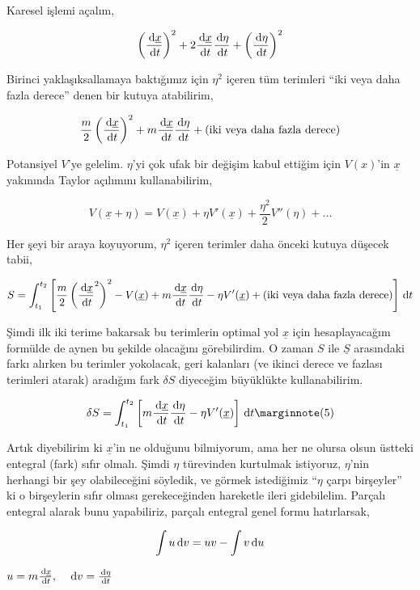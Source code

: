 \documentclass[12pt,fleqn]{article}\usepackage{../../common}
\begin{document}
Karesel işlemi açalım, 

$$ 
\left( \frac{\,\mathrm{d} \underline{x}}{\,\mathrm{d} t}\right)^2 + 
2 \frac{\,\mathrm{d} \underline{x}}{\,\mathrm{d} t} \frac{\,\mathrm{d} \eta}{\,\mathrm{d} t} +
\left( \frac{\,\mathrm{d} \eta}{\,\mathrm{d} t}\right)^2
$$

Birinci yaklaşıksallamaya baktığımız için $\eta^2$ içeren tüm terimleri
``iki veya daha fazla derece'' denen bir kutuya atabilirim, 

$$ 
\frac{m}{2} \left( \frac{\,\mathrm{d} \underline{x}}{\,\mathrm{d} t}\right)^2 + 
m \frac{\,\mathrm{d} \underline{x}}{\,\mathrm{d} t} \frac{\,\mathrm{d} \eta}{\,\mathrm{d} t} + 
(\textrm{iki veya daha fazla derece})
$$

Potansiyel $V$'ye gelelim. $\eta$'yi çok ufak bir değişim kabul ettiğim
için $V(x)$'in $\underline{x}$ yakınında Taylor açılımını kullanabilirim, 

$$ 
V(\underline{x} + \eta) = 
V(\underline{x}) + \eta V'(\underline{x}) + 
\frac{\eta^2}{2}V''(\eta) + ...
$$

Her şeyi bir araya koyuyorum, $\eta^2$ içeren terimler daha önceki kutuya
düşecek tabii, 

$$ 
S = \int _{t_1}^{t_2} \left[
\frac{m}{2} \left( \frac{\,\mathrm{d} \underline{x}}{\,\mathrm{d} t}^2 \right)^2
- V(\underline{x}) 
+ m \frac{\,\mathrm{d} \underline{x}}{\,\mathrm{d} t} \frac{\,\mathrm{d} \eta}{\,\mathrm{d} t} 
- \eta V'(\underline{x}) + (\textrm{iki veya daha fazla derece})
\right] \,\mathrm{d} t 
$$

Şimdi ilk iki terime bakarsak bu terimlerin optimal yol $\underline{x}$
için hesaplayacağım formülde de aynen bu şekilde olacağını görebilirdim. O
zaman $S$ ile $\underline{S}$ arasındaki farkı alırken bu terimler
yokolacak, geri kalanları (ve ikinci derece ve fazlası terimleri atarak)
aradığım fark $\delta S$ diyeceğim büyüklükte kullanabilirim.

$$ 
\delta S = \int _{t_1}^{t_2} \left[ 
m \frac{\ud\underline{x}}{\ud t} \frac{\ud\eta}{\ud t} - \eta V'(\underline{x})
\right] \ud t 
\mlabel{5}
$$

Artık diyebilirim ki $\underline{x}$'in ne olduğunu bilmiyorum, ama her ne
olursa olsun üstteki entegral (fark) sıfır olmalı. Şimdi $\eta$ türevinden
kurtulmak istiyoruz, $\eta$'nin herhangi bir şey olabileceğini söyledik, ve
görmek istediğimiz ``$\eta$ çarpı birşeyler'' ki o birşeylerin sıfır olması
gerekeceğinden hareketle ileri gidebilelim. Parçalı entegral alarak bunu
yapabiliriz, parçalı entegral genel formu hatırlarsak,

$$ 
\int u \,\mathrm{d} v = uv - \int v \,\mathrm{d} u
$$

$u = m \frac{\,\mathrm{d}\underline{x}}{\,\mathrm{d} t}, \quad \,\mathrm{d} v = \frac{\,\mathrm{d} \eta}{\,\mathrm{d} t}$
\end{document}
